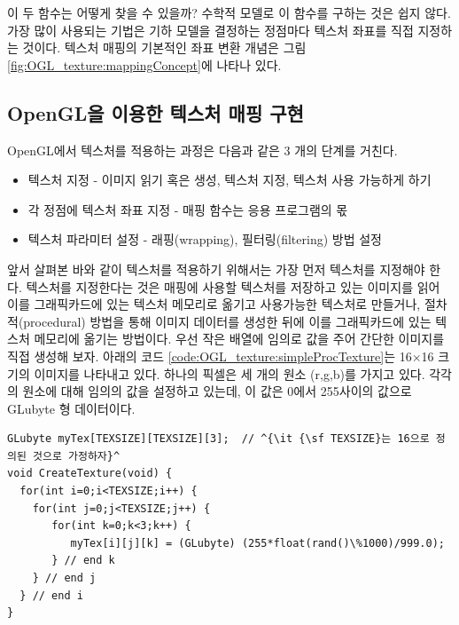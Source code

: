 이 두 함수는 어떻게 찾을 수 있을까? 수학적 모델로 이 함수를 구하는 것은 쉽지 않다. 
가장 많이 사용되는 기법은 기하 모델을 결정하는 정점마다 텍스처 좌표를 직접 지정하는 것이다.
텍스처 매핑의 기본적인 좌표 변환 개념은 그림 \ref{fig:OGL_texture:mappingConcept}에 나타나 있다.


\subsection{OpenGL을 이용한 텍스처 매핑 구현}
OpenGL에서 텍스처를 적용하는 과정은 다음과 같은 3 개의 단계를 거친다.
\begin{itemize}
\item {\small \sf 텍스처 지정  - 이미지 읽기 혹은 생성, 텍스처 지정, 텍스처 사용 가능하게 하기}
\item {\small \sf 각 정점에 텍스처 좌표 지정 - 매핑 함수는 응용 프로그램의 몫}
\item{\small \sf 텍스처 파라미터 설정 - 래핑(wrapping), 필터링(filtering) 방법 설정}
\end{itemize}

앞서 살펴본 바와 같이 텍스처를 적용하기 위해서는 가장 먼저 텍스처를 지정해야 한다. 텍스처를 지정한다는 것은 매핑에 사용할 텍스처를 저장하고 있는 이미지를 읽어 이를 그래픽카드에 있는 텍스처 메모리로 옮기고 사용가능한 텍스처로 만들거나, 절차적(procedural) 방법을 통해 이미지 데이터를 생성한 뒤에 이를 그래픽카드에 있는 텍스처 메모리에 옮기는 방법이다. 우선 작은 배열에 임의로 값을 주어 간단한 이미지를 직접 생성해 보자. 아래의 코드 \ref{code:OGL_texture:simpleProcTexture}는 
16$\times$16 크기의 이미지를 나타내고 있다. 하나의 픽셀은 세 개의 원소 (r,g,b)를 가지고 있다. 각각의 원소에 대해 임의의 값을 설정하고 있는데, 이 값은 0에서 255사이의 값으로 GLubyte 형 데이터이다. 

\begin{algorithmbis}\label{code:OGL_texture:simpleProcTexture}
\lstset{language=C++, escapechar=^} 
\begin{lstlisting}
GLubyte myTex[TEXSIZE][TEXSIZE][3];  // ^{\it {\sf TEXSIZE}는 16으로 정의된 것으로 가정하자}^
void CreateTexture(void) {
  for(int i=0;i<TEXSIZE;i++) {
    for(int j=0;j<TEXSIZE;j++) {
       for(int k=0;k<3;k++) {			
          myTex[i][j][k] = (GLubyte) (255*float(rand()\%1000)/999.0);
       } // end k
    } // end j
  } // end i
}
\end{lstlisting}
\end{algorithmbis}

